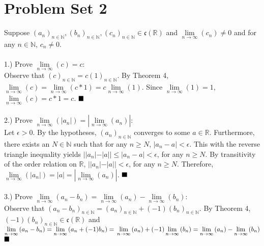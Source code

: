 \documentclass{book}
\newcommand{\setbackgroundcolour}{\pagecolor[rgb]{0.2,0.2,0.2}}
\newcommand{\settextcolour}{\color[rgb]{0.8,0.8,0.8}}
\newcommand{\invertbackgroundtext}{\setbackgroundcolour\settextcolour}
\begin{document}
\invertbackgroundtext
\setlength{\parindent}{0pt}

\section{Problem Set 2}
Suppose $(a_n)_{n \in \mathbb{N}}, (b_n)_{n \in \mathbb{N}}, (c_n)_{n \in \mathbb{N}} \in \mathfrak{c}(\mathbb{R})$ and $\lim \limits_{n \to \infty}{}(c_n) \neq 0$ and for any $n \in \mathbb{N}$, $c_n \neq 0$. \\ \\


1.) Prove $\lim \limits_{n \to \infty}{}(c) = c$: \\
Observe that $(c)_{n \in \mathbb{N}} = c (1)_{n \in \mathbb{N}}$. By Theorem 4, $\lim \limits_{n \to \infty}{}(c) = \lim \limits_{n \to \infty}{}(c * 1) = c \lim \limits_{n \to \infty}{}(1)$. Since $\lim \limits_{n \to \infty}{}(1) = 1$, $\lim \limits_{n \to \infty}{}(c) = c * 1 = c$.
$\hfill \blacksquare$ \\ \\


2.) Prove $\lim \limits_{n \to \infty}{}(|a_n|) = |\lim \limits_{n \to \infty}{}(a_n)|$: \\
Let $\epsilon > 0$. By the hypotheses, $(a_n)_{n \in \mathbb{N}}$ converges to some $a \in \mathbb{R}$. Furthermore, there exists an $N \in \mathbb{N}$ such that for any $n \geq N$, $|a_n - a| < \epsilon$. This with the reverse triangle inequality yields $||a_n| - |a|| \leq |a_n - a| < \epsilon$, for any $n \geq N$. By transitivity of the order relation on $\mathbb{R}$, $||a_n| - |a|| < \epsilon$, for any $n \geq N$. Therefore, $\lim \limits_{n \to \infty}{}(|a_n|) = |a| = |\lim \limits_{n \to \infty}{}(a_n)|$.
$\hfill \blacksquare$ \\ \\


3.) Prove $\lim \limits_{n \to \infty}{}(a_n - b_n) = \lim \limits_{n \to \infty}{}(a_n) - \lim \limits_{n \to \infty}{}(b_n)$: \\
Observe that $(a_n - b_n)_{n \in \mathbb{N}} = (a_n)_{n \in \mathbb{N}} + (-1) (b_n)_{n \in \mathbb{N}}$. By Theorem 4, $(-1) (b_n)_{n \in \mathbb{N}} \in \mathfrak{c}(\mathbb{R})$ and $\lim \limits_{n \to \infty}{}(a_n - b_n) = \lim \limits_{n \to \infty}{}(a_n + (-1) b_n) = \\
\lim \limits_{n \to \infty}{}(a_n) + (-1) \lim \limits_{n \to \infty}{}(b_n) = \lim \limits_{n \to \infty}{}(a_n) - \lim \limits_{n \to \infty}{}(b_n)$
$\hfill \blacksquare$ \\ \\
\end{document}
